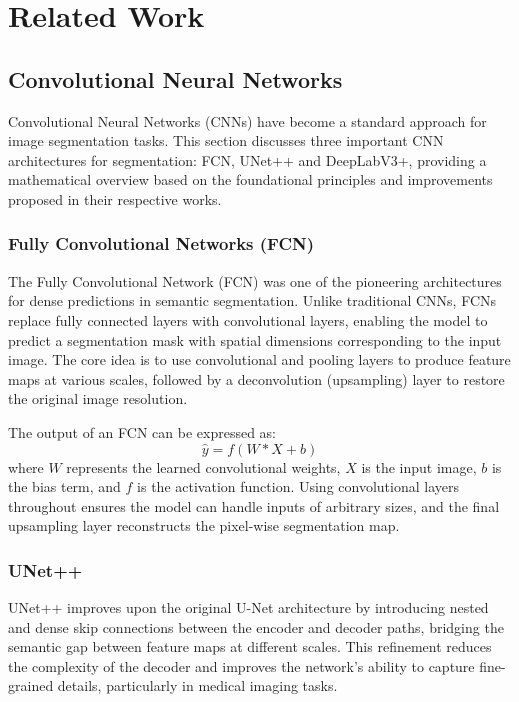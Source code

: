 \section{Related Work}
\subsection{Convolutional Neural Networks}

Convolutional Neural Networks (CNNs) have become a standard approach for image segmentation tasks. This section discusses three important CNN architectures for segmentation: FCN, UNet++ and DeepLabV3+, providing a mathematical overview based on the foundational principles and improvements proposed in their respective works.

\subsubsection{Fully Convolutional Networks (FCN)}

The Fully Convolutional Network (FCN) \cite{long2015fcn} was one of the pioneering architectures for dense predictions in semantic segmentation. Unlike traditional CNNs, FCNs replace fully connected layers with convolutional layers, enabling the model to predict a segmentation mask with spatial dimensions corresponding to the input image. The core idea is to use convolutional and pooling layers to produce feature maps at various scales, followed by a deconvolution (upsampling) layer to restore the original image resolution.

The output of an FCN can be expressed as:
\[
\hat{y} = f(W \ast X + b)
\]
where $W$ represents the learned convolutional weights, $X$ is the input image, $b$ is the bias term, and $f$ is the activation function. Using convolutional layers throughout ensures the model can handle inputs of arbitrary sizes, and the final upsampling layer reconstructs the pixel-wise segmentation map.

\subsubsection{UNet++}

UNet++ \cite{zhou2019unet++} improves upon the original U-Net architecture by introducing nested and dense skip connections between the encoder and decoder paths, bridging the semantic gap between feature maps at different scales. This refinement reduces the complexity of the decoder and improves the network's ability to capture fine-grained details, particularly in medical imaging tasks.

